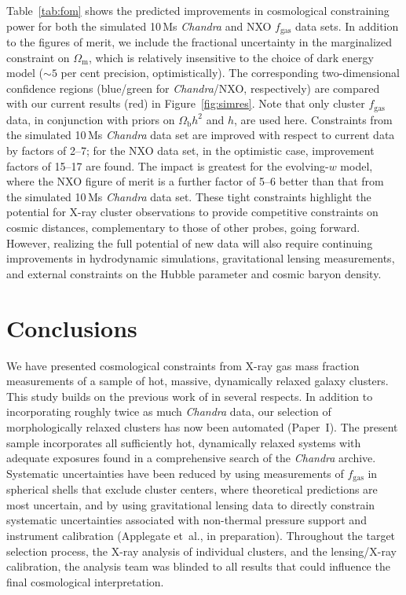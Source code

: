 \documentclass[useAMS,usenatbib,usegraphicx]{mn2e}
\newcommand*{\mysub}[2]{\ensuremath{#1_{\mathrm{#2}}}}
\newcommand*{\Omegam}{\mysub{\Omega}{m}}
\newcommand*{\Omegab}{\mysub{\Omega}{b}}
\newcommand*{\fgas}{\mysub{f}{gas}}
\newcommand*{\figref}{Figure}
\newcommand*{\tabref}{Table}
\newcommand*{\Chandra}{{\it Chandra}}
\newcommand*{\arsemf}{\citetalias{Allen0706.0033}}
\newcommand*{\morphpaper}{Paper~I}
\begin{document}
\tabref~\ref{tab:fom} shows the predicted improvements in cosmological constraining power for both the simulated 10\,Ms \Chandra{} and NXO \fgas{} data sets. In addition to the figures of merit, we include the fractional uncertainty in the marginalized constraint on \Omegam, which is relatively insensitive to the choice of dark energy model ($\sim5$ per cent precision, optimistically). The corresponding two-dimensional confidence regions (blue/green for \Chandra{}/NXO, respectively) are compared with our current results (red) in \figref~\ref{fig:simres}. Note that only cluster \fgas{} data, in conjunction with priors on $\Omegab h^2$ and $h$, are used here. Constraints from the simulated 10\,Ms \Chandra{} data set are improved with respect to current data by factors of 2--7; for the NXO data set, in the optimistic case, improvement factors of 15--17 are found. The impact is greatest for the evolving-$w$ model, where the NXO figure of merit is a further factor of 5--6 better than that from the simulated 10\,Ms \Chandra{} data set. These tight constraints highlight the potential for X-ray cluster observations to provide competitive constraints on cosmic distances, complementary to those of other probes, going forward. However, realizing the full potential of new data will also require continuing improvements in hydrodynamic simulations, gravitational lensing measurements, and external constraints on the Hubble parameter and cosmic baryon density.






\section{Conclusions} \label{sec:cosmosummary}

We have presented cosmological constraints from X-ray gas mass fraction measurements of a sample of hot, massive, dynamically relaxed galaxy clusters. This study builds on the previous work of \arsemf{} in several respects. In addition to incorporating roughly twice as much \Chandra{} data, our selection of morphologically relaxed clusters has now been automated (\morphpaper{}). The present sample incorporates all sufficiently hot, dynamically relaxed systems with adequate exposures found in a comprehensive search of the \Chandra{} archive. Systematic uncertainties have been reduced by using measurements of \fgas{} in spherical shells that exclude cluster centers, where theoretical predictions are most uncertain, and by using gravitational lensing data to directly constrain systematic uncertainties associated with non-thermal pressure support and instrument calibration (Applegate et~al., in preparation). Throughout the target selection process, the X-ray analysis of individual clusters, and the lensing/X-ray calibration, the analysis team was blinded to all results that could influence the final cosmological interpretation.
\end{document}
